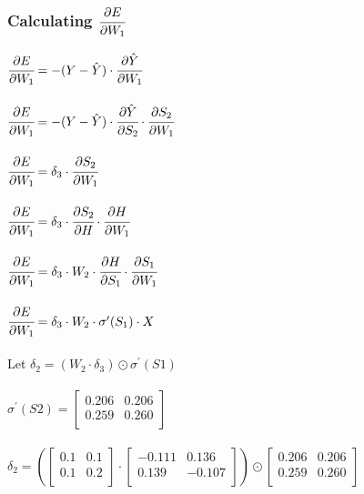 \documentclass{article}
\begin{document}
\subsubsection{Calculating $\cfrac{\partial E}{\partial W_1}$}
$\cfrac{\partial E}{\partial W_1} = -(Y- \hat{Y})\cdot
\cfrac{\partial \hat{Y}}{\partial W_1}$\\
\\$\cfrac{\partial E}{\partial W_1} = -(Y- \hat{Y})\cdot
\cfrac{\partial \hat{Y}}{\partial S_2} \cdot \cfrac{\partial S_2}{\partial W_1}$\\
\\$\cfrac{\partial E}{\partial W_1} = \delta_3 \cdot \cfrac{\partial S_2}{\partial W_1}$\\
\\$\cfrac{\partial E}{\partial W_1} = \delta_3 \cdot \cfrac{\partial S_2}{\partial H} \cdot \cfrac{\partial H}{\partial W_1}$\\
\\$\cfrac{\partial E}{\partial W_1} = \delta_3 \cdot W_2 \cdot
\cfrac{\partial H}{\partial S_1} \cdot \cfrac{\partial S_1}{\partial W_1}$\\
\\$\cfrac{\partial E}{\partial W_1} = \delta_3 \cdot W_2 \cdot
\sigma^\prime(S_1) \cdot X$\\
\\Let $\delta_2 = (W_2 \cdot \delta_3) \odot \sigma^\prime(S1)$ \\
\\$\sigma^\prime(S2) = 
\begin{bmatrix}
0.206 & 0.206 \\
0.259 & 0.260 \\
\end{bmatrix}$\\
\\$\delta_2 = 
(\begin{bmatrix}
0.1 & 0.1 \\
0.1 & 0.2 \\
\end{bmatrix} \cdot
\begin{bmatrix}
-0.111 & 0.136 \\
0.139 & -0.107 \\
\end{bmatrix}) \odot
\begin{bmatrix}
0.206 & 0.206 \\
0.259 & 0.260 \\
\end{bmatrix}$\\
\end{document}
